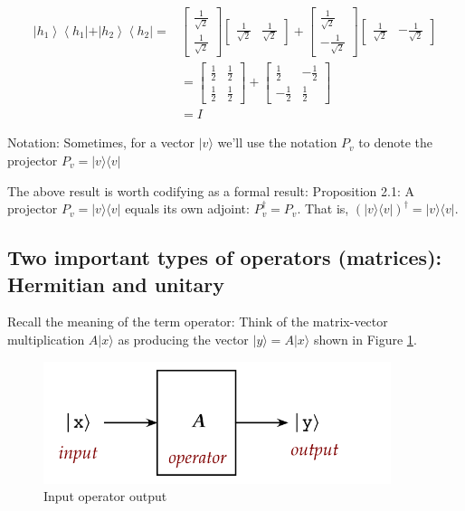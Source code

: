 \documentclass[main.tex]{subfiles}
\begin{document}
    $$
    \begin{aligned}
    \left|h_{1}\right\rangle\left\langle h_{1}|+| h_{2}\right\rangle\left\langle h_{2}\right|=& {\left[\begin{array}{c}
    \frac{1}{\sqrt{2}} \\
    \frac{1}{\sqrt{2}}
    \end{array}\right]\left[\begin{array}{ll}
    \frac{1}{\sqrt{2}} & \frac{1}{\sqrt{2}}
    \end{array}\right]+\left[\begin{array}{c}
    \frac{1}{\sqrt{2}} \\
    -\frac{1}{\sqrt{2}}
    \end{array}\right]\left[\begin{array}{ll}
    \frac{1}{\sqrt{2}} & -\frac{1}{\sqrt{2}}
    \end{array}\right] } \\
    &=\left[\begin{array}{ll}
    \frac{1}{2} & \frac{1}{2} \\
    \frac{1}{2} & \frac{1}{2}
    \end{array}\right]+\left[\begin{array}{cc}
    \frac{1}{2} & -\frac{1}{2} \\
    -\frac{1}{2} & \frac{1}{2}
    \end{array}\right] \\
    &=I
    \end{aligned}
    $$
    
    Notation: Sometimes, for a vector $|v\rangle$ we'll use the notation $P_{v}$ to denote the projector $P_{v}=|v\rangle\langle v|$
    
    The above result is worth codifying as a formal result: Proposition 2.1: A projector $P_{v}=|v\rangle\langle v|$ equals its own adjoint: $P_{v}^{\dagger}=P_{v}$. That is, $(|v\rangle\langle v|)^{\dagger}=|v\rangle\langle v|$.


\subsection{Two important types of operators (matrices): Hermitian and unitary}

    Recall the meaning of the term operator: Think of the matrix-vector multiplication $A|x\rangle$ as producing the vector $|y\rangle=A|x\rangle$ shown in Figure \ref{fig:15operator.png}.
    
    \begin{figure}
        \centering
        \includegraphics[width=4in]{notes/figs/n04/15operator.png}
        \caption{Input operator output}
        \label{fig:15operator.png}
    \end{figure}
    
\end{document}
